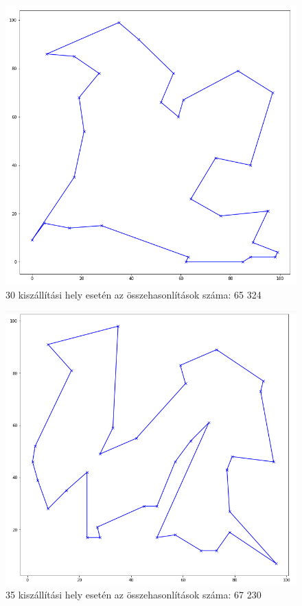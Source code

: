 \begin{figure}[h!]
\centering
\includegraphics[scale=0.4]{images/30.png}
\caption{30 kiszállítási hely esetén az összehasonlítások száma: 65 324}
\label{fig:tsp30location}
\end{figure}

\begin{figure}[h!]
\centering
\includegraphics[scale=0.4]{images/35.png}
\caption{35 kiszállítási hely esetén az összehasonlítások száma: 67 230}
\label{fig:tsp35location}
\end{figure}

